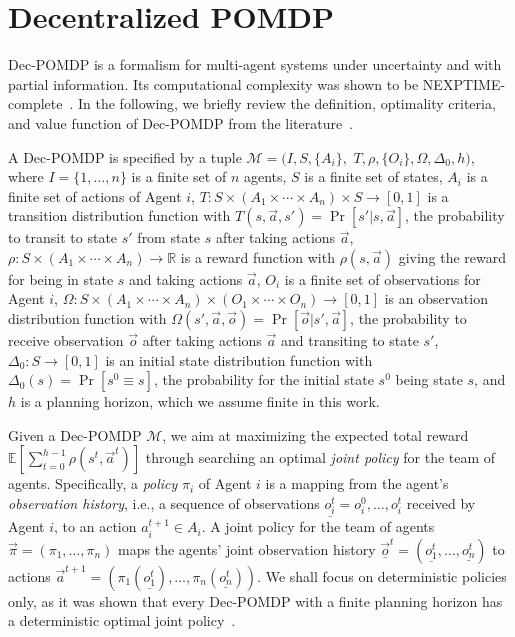 \section{Decentralized POMDP}
\label{sect:dec-pomdp}

Dec-POMDP is a formalism for multi-agent systems under uncertainty and with partial information.
Its computational complexity was shown to be NEXPTIME-complete~\cite{Bernstein2002}.
In the following, we briefly review the definition, optimality criteria, and value function of Dec-POMDP from the literature~\cite{Oliehoek2016}.

A Dec-POMDP is specified by a tuple $\mathcal{M} = (I,S,\{A_i\},$ $T,  \rho, \{O_i\}, \Omega, \Delta_0, h)$,
where
$I=\{1,\ldots,n\}$ is a finite set of $n$ agents,
$S$ is a finite set of states,
$A_i$ is a finite set of actions of Agent $i$,
$T: S \times (A_1 \times \cdots \times A_n) \times S \rightarrow [0,1]$ is a transition distribution function with
$T(s,\Vec{a},s')=\Pr[s'|s,\vec{a}]$,
the probability to transit to state $s'$ from state $s$ after taking actions $\vec{a}$,
$\rho: S \times (A_1 \times \cdots \times A_n) \rightarrow \mathbb{R}$ is a reward function with $\rho(s, \vec{a})$ giving the reward for being in state $s$ and taking actions $\vec{a}$,
$O_i$ is a finite set of observations for Agent $i$,
$\Omega: S \times (A_1 \times \cdots \times A_n) \times (O_1 \times \cdots \times O_n) \rightarrow [0,1]$ is an observation distribution function with
$\Omega(s',\Vec{a},\vec{o})=\Pr[\vec{o}|s',\vec{a}]$, the probability to receive observation $\vec{o}$ after taking actions $\vec{a}$ and transiting to state $s'$, $\Delta_0: S \rightarrow [0,1]$ is an initial state distribution function with $\Delta_0(s)=\Pr[s^0 \equiv s]$, the probability for the initial state $s^0$ being state $s$, and $h$ is a planning horizon, which we assume finite in this work.

Given a Dec-POMDP $\mathcal{M}$, we aim at maximizing the expected total reward $\mathbb{E}[\sum_{t=0}^{h-1}\rho(s^t,\vec{a}^t)]$ through searching an optimal \textit{joint policy} for the team of agents.
Specifically, a \textit{policy} $\pi_i$ of Agent $i$ is a mapping from the agent's \textit{observation history}, i.e., a sequence of observations $\underline{o_i^t}=o_i^0,\ldots,o_i^t$ received by Agent $i$, to an action $a_i^{t+1}\in A_i$.
A joint policy for the team of agents $\vec{\pi}=(\pi_1,\ldots,\pi_n)$ maps the agents' joint observation history $\vec{\underline{o}}^t=(\underline{o_1^t},\ldots,\underline{o_n^t})$ to actions $\vec{a}^{t+1}=(\pi_1(\underline{o_1^t}),\ldots,\pi_n(\underline{o_n^t}))$.
We shall focus on deterministic policies only, as it was shown that every Dec-POMDP with a finite planning horizon has a deterministic optimal joint policy~\cite{Oliehoek2008}.


